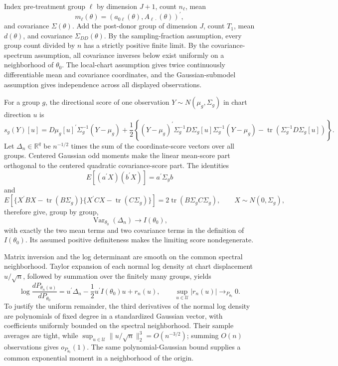 Index pre-treatment group \(\ell\) by dimension \(J+1\), count \(n_\ell\), mean
\[
m_\ell(\theta)=(a_{0\ell}(\theta),A_{\ell\cdot}(\theta))^{\prime},
\]
and covariance \(\Sigma(\theta)\).  Add the post-donor group of dimension \(J\), count \(T_1\), mean \(d(\theta)\), and covariance \(\Sigma_{DD}(\theta)\).  By the sampling-fraction assumption, every group count divided by \(n\) has a strictly positive finite limit.  By the covariance-spectrum assumption, all covariance inverses below exist uniformly on a neighborhood of \(\theta_0\).  The local-chart assumption gives twice continuously differentiable mean and covariance coordinates, and the Gaussian-submodel assumption gives independence across all displayed observations.

For a group \(g\), the directional score of one observation \(Y\sim N(\mu_g,\Sigma_g)\) in chart direction \(u\) is
\[
s_g(Y)[u]
=D\mu_g[u]^{\prime}\Sigma_g^{-1}(Y-\mu_g)
+\frac12\left\{
(Y-\mu_g)^{\prime}\Sigma_g^{-1}D\Sigma_g[u]
\Sigma_g^{-1}(Y-\mu_g)
-\operatorname{tr}(\Sigma_g^{-1}D\Sigma_g[u])
\right\}.
\]
Let \(\Delta_n\in\mathbb R^q\) be \(n^{-1/2}\) times the sum of the coordinate-score vectors over all groups.  Centered Gaussian odd moments make the linear mean-score part orthogonal to the centered quadratic covariance-score part.  The identities
\[
E[(a^{\prime}X)(b^{\prime}X)]=a^{\prime}\Sigma_gb
\]
and
\[
E\!\left[
\{X^{\prime}BX-\operatorname{tr}(B\Sigma_g)\}
\{X^{\prime}CX-\operatorname{tr}(C\Sigma_g)\}
\right]
=2\operatorname{tr}(B\Sigma_gC\Sigma_g),
\qquad X\sim N(0,\Sigma_g),
\]
therefore give, group by group,
\[
\operatorname{Var}_{\theta_0}(\Delta_n)\longrightarrow I(\theta_0),
\]
with exactly the two mean terms and two covariance terms in the definition of \(I(\theta_0)\).  Its assumed positive definiteness makes the limiting score nondegenerate.

Matrix inversion and the log determinant are smooth on the common spectral neighborhood.  Taylor expansion of each normal log density at chart displacement \(u/\sqrt n\), followed by summation over the finitely many groups, yields
\[
\log\frac{dP_{\theta_n(u)}}{dP_{\theta_0}}
=u^{\prime}\Delta_n-\frac12u^{\prime}I(\theta_0)u+r_n(u),
\qquad
\sup_{u\in\mathcal U}|r_n(u)|
\longrightarrow_{P_{\theta_0}}0.
\]
To justify the uniform remainder, the third derivatives of the normal log density are polynomials of fixed degree in a standardized Gaussian vector, with coefficients uniformly bounded on the spectral neighborhood.  Their sample averages are tight, while
\(\sup_{u\in\mathcal U}\lVert u/\sqrt n\rVert_2^3=O(n^{-3/2})\); summing \(O(n)\) observations gives \(o_{P_{\theta_0}}(1)\).  The same polynomial-Gaussian bound supplies a common exponential moment in a neighborhood of the origin.

